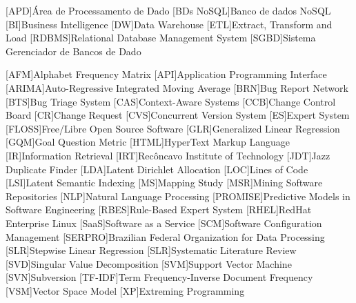 \begin{acronym}[ACRONYM] 


[APD]{Área de Processamento de Dado}
[BDs NoSQL]{Banco de dados NoSQL}
[BI]{Business Intelligence}
[DW]{Data Warehouse}
[ETL]{Extract, Transform and Load}
[RDBMS]{Relational Database Management System}
[SGBD]{Sistema Gerenciador de Bancos de Dado}


[AFM]{Alphabet Frequency Matrix}
[API]{Application Programming Interface}
[ARIMA]{Auto-Regressive Integrated Moving Average}
[BRN]{Bug Report Network}
[BTS]{Bug Triage System}
[CAS]{Context-Aware Systems}
[CCB]{Change Control Board}
[CR]{Change Request}
[CVS]{Concurrent Version System}
[ES]{Expert System}
[FLOSS]{Free/Libre Open Source Software}
[GLR]{Generalized Linear Regression}
[GQM]{Goal Question Metric}
[HTML]{HyperText Markup Language}
[IR]{Information Retrieval}
[IRT]{Recôncavo Institute of Technology}
[JDT]{Jazz Duplicate Finder}
[LDA]{Latent Dirichlet Allocation}
[LOC]{Lines of Code}
[LSI]{Latent Semantic Indexing}
[MS]{Mapping Study}
[MSR]{Mining Software Repositories}
[NLP]{Natural Language Processing}
[PROMISE]{Predictive Models in Software Engineering}
[RBES]{Rule-Based Expert System}
[RHEL]{RedHat Enterprise Linux}
[SaaS]{Software as a Service}
[SCM]{Software Configuration Management}
[SERPRO]{Brazilian Federal Organization for Data Processing}
[SLR]{Stepwise Linear Regression}
[SLR]{Systematic Literature Review}
[SVD]{Singular Value Decomposition}
[SVM]{Support Vector Machine}
[SVN]{Subversion}
[TF-IDF]{Term Frequency-Inverse Document Frequency}
[VSM]{Vector Space Model}
[XP]{Extreming Programming}
\end{acronym}